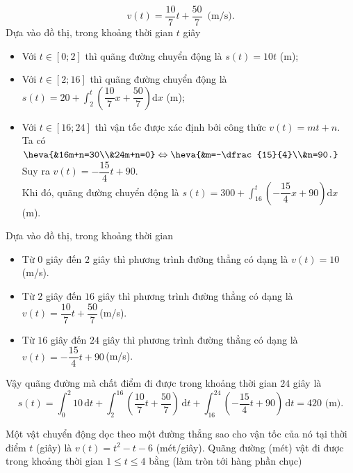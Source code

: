\begin{ex}
{\begin{itemchoice}
			\[v(t)=\dfrac{10}{7}t+\dfrac{50}{7}\,\text{ (m/s)}.\] 
			\itemch Dựa vào đồ thị,  trong khoảng thời gian $t$ giây
			\begin{itemize}
				\item Với $t\in  [0;2]$ thì quãng đường chuyển động là $s(t)=10t$ (m);
				\item Với $t\in  [2;16]$ thì quãng đường chuyển động là $s(t)=20+\displaystyle\int_2^t \left(\dfrac{10}{7}x+\dfrac{50}{7}\right)\mathrm{d}x$ (m);
				\item Với $t\in [16;24]$ thì vận tốc được xác định bởi công thức 
				 $v(t)=mt+n$.\\
				Ta có  $\heva{&16m+n=30\\&24m+n=0}\Leftrightarrow\heva{&m=-\dfrac{15}{4}\\&n=90.}$\\
				Suy ra  $v(t)=-\dfrac{15}{4}t+90$.\\
				Khi đó, quãng  đường chuyển động là $s(t)=300+\displaystyle\int_{16}^{t} \left(-\dfrac{15}{4}x+90\right)\mathrm{d}x$ (m).
			\end{itemize}
			 \itemch Dựa vào đồ thị, trong khoảng thời gian
			\begin{itemize}
				\item Từ $0$ giây đến $2$ giây thì phương trình  đường thẳng có dạng là $v(t)=10$\,(m/s).
				\item Từ $2$ giây đến $16$ giây thì phương trình đường thẳng có dạng là $v(t)=\dfrac{10}{7}t+\dfrac{50}{7}$\,(m/s). 
				\item Từ $16$ giây đến $24$ giây thì phương trình đường thẳng  có dạng là \break $v(t)=-\dfrac{15}{4}t+90$\,(m/s).
			\end{itemize}
			Vậy quãng đường mà chất điểm đi được trong  khoảng thời gian $24$ giây là \[s(t)=\displaystyle\int_0^2 10 \mathrm{\,d}t+\displaystyle\int_2^{16} \left(\dfrac{10}{7}t+\dfrac{50}{7}\right)\mathrm{\,d}t+\displaystyle\int_{16}^{24} \left(-\dfrac{15}{4}t+90\right)\mathrm{\,d}t=420 \text{ (m).}\]
		\end{itemchoice}
	} 
\end{ex}

\begin{bt}%
	Một vật chuyển động dọc theo một đường thẳng sao cho vận tốc của nó tại thời điểm $t$ (giây) là $v(t)=t^2-t-6$ (mét/giây). Quãng đường (mét) vật đi được trong khoảng thời gian $1 \le t \le 4$  bằng (làm tròn tới hàng phần chục)
\end{bt}


